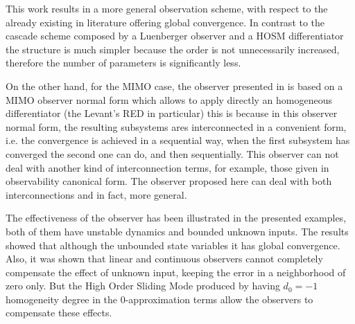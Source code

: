 \documentclass[11pt,letterpaper,twoside,openright]{report}
\begin{document}
This work results in a more general observation scheme, with respect to the already existing in literature offering global convergence. In contrast to the cascade scheme \cite{Fridman2006} composed by a Luenberger observer and a HOSM differentiator the structure is much simpler because the order is not unnecessarily increased, therefore the number of parameters is significantly less.

On the other hand, for the MIMO case, the observer presented in \cite{Niederwieser2021} is based on a MIMO observer normal form which allows to apply directly an homogeneous differentiator (the Levant's RED in particular) this is because in this observer normal form, the resulting subsystems ares interconnected in a convenient form, i.e. the convergence is achieved in a sequential way, when the first subsystem has converged the second one can do, and then sequentially. This observer can not deal with another kind of interconnection terms, for example, those given in observability canonical form. The observer proposed here can deal with both interconnections and in fact, more general. 

The effectiveness of the observer has been illustrated in the presented examples, both of them have unstable dynamics and bounded unknown inputs. The results showed that although the unbounded state variables it has global convergence. Also, it was shown that linear and continuous observers cannot completely compensate the effect of unknown input, keeping the error in a neighborhood of zero only. But the High Order Sliding Mode produced by having $d_0=-1$ homogeneity degree in the $0$-approximation terms allow the observers to compensate these effects. 
\end{document}
